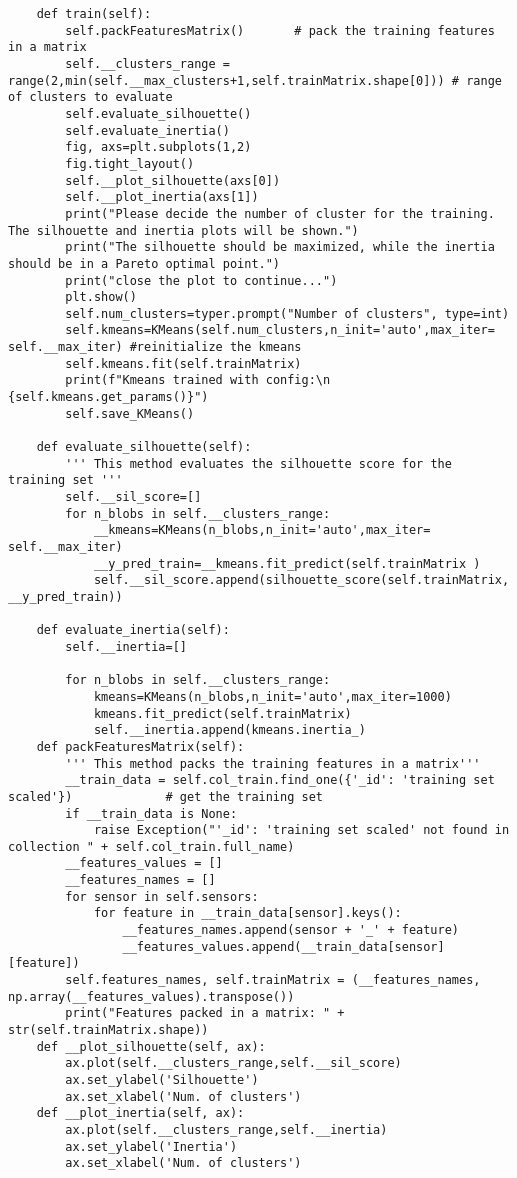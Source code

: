 \begin{verbatim}
    def train(self):
        self.packFeaturesMatrix()       # pack the training features in a matrix
        self.__clusters_range = range(2,min(self.__max_clusters+1,self.trainMatrix.shape[0])) # range of clusters to evaluate
        self.evaluate_silhouette()
        self.evaluate_inertia()
        fig, axs=plt.subplots(1,2)
        fig.tight_layout()
        self.__plot_silhouette(axs[0])
        self.__plot_inertia(axs[1])
        print("Please decide the number of cluster for the training. The silhouette and inertia plots will be shown.")
        print("The silhouette should be maximized, while the inertia should be in a Pareto optimal point.")
        print("close the plot to continue...")
        plt.show()
        self.num_clusters=typer.prompt("Number of clusters", type=int)
        self.kmeans=KMeans(self.num_clusters,n_init='auto',max_iter= self.__max_iter) #reinitialize the kmeans
        self.kmeans.fit(self.trainMatrix)
        print(f"Kmeans trained with config:\n {self.kmeans.get_params()}")
        self.save_KMeans()
    
    def evaluate_silhouette(self):
        ''' This method evaluates the silhouette score for the training set '''
        self.__sil_score=[]
        for n_blobs in self.__clusters_range:
            __kmeans=KMeans(n_blobs,n_init='auto',max_iter= self.__max_iter)
            __y_pred_train=__kmeans.fit_predict(self.trainMatrix )
            self.__sil_score.append(silhouette_score(self.trainMatrix, __y_pred_train))
    
    def evaluate_inertia(self):
        self.__inertia=[]
        
        for n_blobs in self.__clusters_range:
            kmeans=KMeans(n_blobs,n_init='auto',max_iter=1000)
            kmeans.fit_predict(self.trainMatrix)
            self.__inertia.append(kmeans.inertia_)
    def packFeaturesMatrix(self):
        ''' This method packs the training features in a matrix'''
        __train_data = self.col_train.find_one({'_id': 'training set scaled'})             # get the training set
        if __train_data is None:
            raise Exception("'_id': 'training set scaled' not found in collection " + self.col_train.full_name)
        __features_values = []
        __features_names = []
        for sensor in self.sensors:
            for feature in __train_data[sensor].keys():
                __features_names.append(sensor + '_' + feature)
                __features_values.append(__train_data[sensor][feature])
        self.features_names, self.trainMatrix = (__features_names, np.array(__features_values).transpose())
        print("Features packed in a matrix: " + str(self.trainMatrix.shape))
    def __plot_silhouette(self, ax):
        ax.plot(self.__clusters_range,self.__sil_score)
        ax.set_ylabel('Silhouette')
        ax.set_xlabel('Num. of clusters')
    def __plot_inertia(self, ax):
        ax.plot(self.__clusters_range,self.__inertia)
        ax.set_ylabel('Inertia')
        ax.set_xlabel('Num. of clusters')
\end{verbatim}
